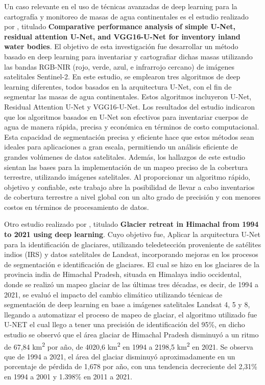  Un caso relevante en el uso de técnicas avanzadas de deep learning para la cartografía y monitoreo de masas de agua continentales es el estudio realizado por  \parencite{ghaznavi2024comparative}, titulado \textbf{Comparative performance analysis of simple U-Net, residual attention U-Net, and VGG16-U-Net for inventory inland water bodies}. El objetivo de esta investigación fue desarrollar un método basado en deep learning para inventariar y cartografiar dichas masas utilizando las bandas RGB-NIR (rojo, verde, azul, e infrarrojo cercano) de imágenes satelitales Sentinel-2. En este estudio, se emplearon tres algoritmos de deep learning diferentes, todos basados en la arquitectura U-Net, con el fin de segmentar las masas de agua continentales. Estos algoritmos incluyeron U-Net, Residual Attention U-Net y VGG16-U-Net. Los resultados del estudio indicaron que los algoritmos basados en U-Net son efectivos para inventariar cuerpos de agua de manera rápida, precisa y económica en términos de costo computacional. Esta capacidad de segmentación precisa y eficiente hace que estos métodos sean ideales para aplicaciones a gran escala, permitiendo un análisis eficiente de grandes volúmenes de datos satelitales. Además, los hallazgos de este estudio sientan las bases para la implementación de un mapeo preciso de la cobertura terrestre, utilizando imágenes satelitales. Al proporcionar un algoritmo rápido, objetivo y confiable, este trabajo abre la posibilidad de llevar a cabo inventarios de cobertura terrestre a nivel global con un alto grado de precisión y con menores costos en términos de procesamiento de datos.
 
 Otro estudio realizado por \parencite{rajat2022glacier}, titulado \textbf{Glacier retreat in Himachal from 1994 to 2021 using deep learning}. Cuyo objetivo fue, Aplicar la arquitectura U-Net para la identificación de glaciares, utilizando teledetección proveniente de satélites indios (IRS) y datos satelitales de Landsat, incorporando mejoras en los procesos de segmentación e identificación de glaciares. El cual se hizo en los glaciares de la provincia india de Himachal Pradesh, situada en Himalaya indio occidental, donde se realizó un mapeo glaciar de las últimas tres décadas, es decir, de 1994 a 2021, se evaluó  el impacto del cambio climático utilizando técnicas de segmentación de deep learning en base a imágenes satelitales Landsat 4, 5 y 8, llegando a automatizar el proceso de mapeo de glaciar, el algoritmo utilizado fue U-NET el cual llego a tener una precisión de identificación del 95{\%}, en dicho estudio se observó que el área glaciar de Himachal Pradesh disminuyó a un ritmo de 67,84 km\textsuperscript{2} por año, de 4020,6 km\textsuperscript{2} en 1994 a 2198,5 km\textsuperscript{2} en 2021. Se observa que de 1994 a 2021, el área del glaciar disminuyó aproximadamente en un porcentaje de pérdida de 1,678 por año, con una tendencia decreciente   del 2,31{\%} en 1994 a ­2001 y 1.398{\%} en 2011­ a 2021.
 
